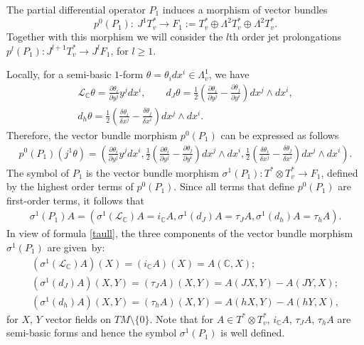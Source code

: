 \documentclass[11pt]{article}
\numberwithin{equation}{section}
\begin{document}
The partial dif\/ferential operator $P_1$ induces a morphism of vector
bundles
\[
 p^0(P_1): \ J^1T^*_v \to F_1:=T^*_v \oplus \Lambda^2 T^*_v \oplus
\Lambda^2 T^*_v.
\] Together with this morphism we will consider the $l$th order jet prolongations $p^l(P_1):
J^{l+1}T^*_v \to J^{l}F_1$, for $l\geq 1$.

Locally, for a semi-basic $1$-form $\theta=\theta_idx^i\in
\Lambda^1_v$, we have
\begin{gather*}
\mathcal{L}_{\mathbb C}\theta=\frac{\partial \theta_i}{\partial
  y^j}y^jdx^i, \qquad d_J\theta = \frac{1}{2}\left(\frac{\partial
\theta_i}{\partial y^j}-\frac{\partial \theta_j}{\partial
y^i}\right)dx^j\wedge dx^i, \\ d_h\theta = \frac{1}{2}\left(\frac{\delta \theta_i}{\delta x^j}-
\frac{\delta \theta_j}{\delta x^i} \right) dx^j\wedge dx^i.
\end{gather*}
Therefore, the vector bundle morphism $p^0(P_1)$ can be expressed as
follows
\begin{gather*}
p^0(P_1)(j^1\theta)= \left(\frac{\partial
\theta_i}{\partial y^j}y^j dx^i, \frac{1}{2}\left(\frac{\partial
\theta_i}{\partial y^j}-\frac{\partial \theta_j}{\partial
y^i}\right) dx^j\wedge dx^i, \frac{1}{2}\left(\frac{\delta \theta_i}{\delta x^j}-
\frac{\delta \theta_j}{\delta x^i}\right) dx^j\wedge dx^i \right).
\end{gather*} The symbol
of $P_1$ is the vector bundle morphism $\sigma^1(P_1): T^*\otimes
T^*_v \to F_1$, def\/ined by the highest order terms of $p^0(P_1)$.
Since all terms that def\/ine $p^0(P_1)$ are f\/irst-order terms,
it follows that
\begin{gather} \sigma^1(P_1)A=\left(
\sigma^1\left(\mathcal{L}_{\mathbb C}\right)A=i_{\mathbb{C}}A,
\sigma^1\left(d_J\right)A=\tau_JA,
\sigma^1\left(d_h\right)A=\tau_hA\right). \label{sigma1p1}
\end{gather}
In view of formula \eqref{taull}, the three components of the vector
bundle morphism $\sigma^1(P_1)$ are given~by:
\begin{gather*}
\left( \sigma^1\left(\mathcal{L}_{\mathbb C}\right)A\right) (X)
 = \left( i_{\mathbb{C}}A\right)(X)=A(\mathbb{C}, X); \\
\left(\sigma^1\left(d_J\right)A\right)(X,Y) = \left(\tau_JA\right)(X,Y)
= A(JX,Y)-A(JY, X); \\
\left(\sigma^1\left(d_h\right)A\right)(X,Y) = \left(\tau_hA\right)(X,Y)
= A(hX,Y)-A(hY, X),
\end{gather*} for $X$, $Y$ vector f\/ields on $TM\setminus\{0\}$.
Note that for $A\in T^*\otimes T^*_v$, $i_{\mathbb{C}}A$, $\tau_JA$,
$\tau_hA$ are semi-basic forms and hence the symbol $\sigma^1(P_1)$ is well
def\/ined.
\end{document}
